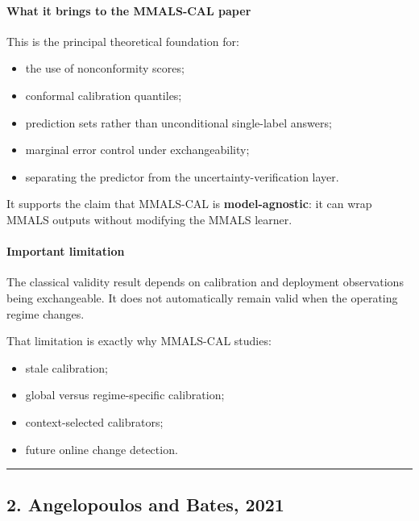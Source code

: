 \paragraph{What it brings to the MMALS-CAL paper}\label{what-it-brings-to-the-mmals-cal-paper}

This is the principal theoretical foundation for:

\begin{itemize}
\tightlist
\item
  the use of nonconformity scores;
\item
  conformal calibration quantiles;
\item
  prediction sets rather than unconditional single-label answers;
\item
  marginal error control under exchangeability;
\item
  separating the predictor from the uncertainty-verification layer.
\end{itemize}

It supports the claim that MMALS-CAL is \textbf{model-agnostic}: it can wrap MMALS outputs without modifying the MMALS learner.

\paragraph{Important limitation}\label{important-limitation}

The classical validity result depends on calibration and deployment observations being exchangeable. It does not automatically remain valid when the operating regime changes.

That limitation is exactly why MMALS-CAL studies:

\begin{itemize}
\tightlist
\item
  stale calibration;
\item
  global versus regime-specific calibration;
\item
  context-selected calibrators;
\item
  future online change detection.
\end{itemize}

\begin{center}\rule{0.5\linewidth}{0.5pt}\end{center}

\subsection{2. Angelopoulos and Bates, 2021}\label{angelopoulos-and-bates-2021}

